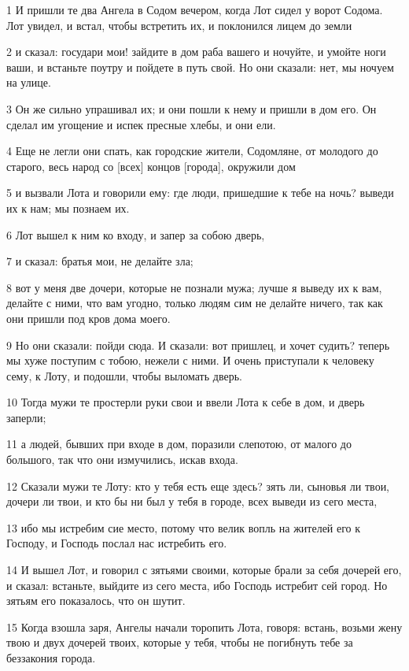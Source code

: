 \par 1 И пришли те два Ангела в Содом вечером, когда Лот сидел у ворот Содома. Лот увидел, и встал, чтобы встретить их, и поклонился лицем до земли
\par 2 и сказал: государи мои! зайдите в дом раба вашего и ночуйте, и умойте ноги ваши, и встаньте поутру и пойдете в путь свой. Но они сказали: нет, мы ночуем на улице.
\par 3 Он же сильно упрашивал их; и они пошли к нему и пришли в дом его. Он сделал им угощение и испек пресные хлебы, и они ели.
\par 4 Еще не легли они спать, как городские жители, Содомляне, от молодого до старого, весь народ со [всех] концов [города], окружили дом
\par 5 и вызвали Лота и говорили ему: где люди, пришедшие к тебе на ночь? выведи их к нам; мы познаем их.
\par 6 Лот вышел к ним ко входу, и запер за собою дверь,
\par 7 и сказал: братья мои, не делайте зла;
\par 8 вот у меня две дочери, которые не познали мужа; лучше я выведу их к вам, делайте с ними, что вам угодно, только людям сим не делайте ничего, так как они пришли под кров дома моего.
\par 9 Но они сказали: пойди сюда. И сказали: вот пришлец, и хочет судить? теперь мы хуже поступим с тобою, нежели с ними. И очень приступали к человеку сему, к Лоту, и подошли, чтобы выломать дверь.
\par 10 Тогда мужи те простерли руки свои и ввели Лота к себе в дом, и дверь заперли;
\par 11 а людей, бывших при входе в дом, поразили слепотою, от малого до большого, так что они измучились, искав входа.
\par 12 Сказали мужи те Лоту: кто у тебя есть еще здесь? зять ли, сыновья ли твои, дочери ли твои, и кто бы ни был у тебя в городе, всех выведи из сего места,
\par 13 ибо мы истребим сие место, потому что велик вопль на жителей его к Господу, и Господь послал нас истребить его.
\par 14 И вышел Лот, и говорил с зятьями своими, которые брали за себя дочерей его, и сказал: встаньте, выйдите из сего места, ибо Господь истребит сей город. Но зятьям его показалось, что он шутит.
\par 15 Когда взошла заря, Ангелы начали торопить Лота, говоря: встань, возьми жену твою и двух дочерей твоих, которые у тебя, чтобы не погибнуть тебе за беззакония города.
